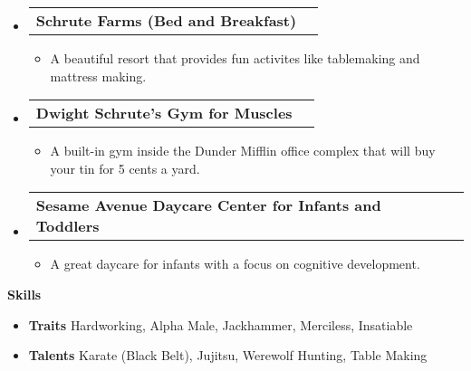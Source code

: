 \documentclass[letterpaper,12pt]{article}
\makeatletter
\def \entryspacing {-0pt}
\renewcommand{\section}[2]{\vspace{5pt}
  \colorbox{secondary}{\color{white}\raggedbottom\normalsize\textbf{{#1}{\hspace{7pt}#2}}}
}
\newcommand{\resumeEntryStart}{\begin{itemize}[leftmargin=2.5mm]}
\newcommand{\resumeEntryEnd}{\end{itemize}\vspace{\entryspacing}}
\newcommand{\resumeItemListStart}{\begin{itemize}[leftmargin=4.5mm]}
\newcommand{\resumeItemListEnd}{\end{itemize}}
\newcommand{\resumeItem}[1]{
  \item\small{
    {#1 \vspace{-2pt}}
  }
}
\newcommand{\resumeEntryTD}[2]{
  \vspace{-1pt}\item[]
    \begin{tabular*}{0.97\textwidth}{l@{\extracolsep{\fill}}r}
      \textbf{\color{primary}#1} & {\firabook\color{accent}\small#2} \\
    \end{tabular*}\vspace{-6pt}
}
\newcommand{\resumeEntryS}[2]{
  \item[]\small{
    \textbf{\color{primary}#1 }{ #2 \vspace{-6pt}}
  }
}
\makeatother
\begin{document}
  \resumeEntryStart
    \resumeEntryTD
      {Schrute Farms (Bed and Breakfast)}{}
    \resumeItemListStart
      \resumeItem {A beautiful resort that provides fun activites like tablemaking and mattress making.}
    \resumeItemListEnd
  \resumeEntryEnd

  \resumeEntryStart
    \resumeEntryTD
      {Dwight Schrute's Gym for Muscles}{}
    \resumeItemListStart
      \resumeItem {A built-in gym inside the Dunder Mifflin office complex that will buy your tin for 5 cents a yard.}
    \resumeItemListEnd
  \resumeEntryEnd

  \resumeEntryStart
    \resumeEntryTD
      {Sesame Avenue Daycare Center for Infants and Toddlers}{}
    \resumeItemListStart
      \resumeItem {A great daycare for infants with a focus on cognitive development.}
    \resumeItemListEnd
  \resumeEntryEnd

\section{\faCogs}{Skills}
 \resumeEntryStart
  \resumeEntryS{Traits } {Hardworking, Alpha Male, Jackhammer, Merciless, Insatiable}
  \resumeEntryS{Talents } {Karate (Black Belt), Jujitsu, Werewolf Hunting, Table Making}
 \resumeEntryEnd
\end{document}
